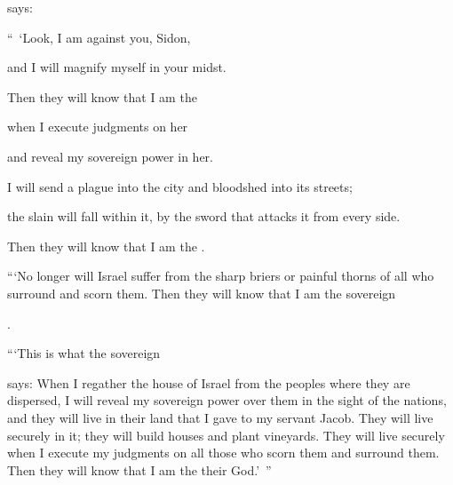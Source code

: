 {{}
says:
\par }{\Q “ ‘Look,
I am against
you, Sidon,
\par }{\Q and I will magnify
myself in your midst.
\par }{\Q Then they will know
that
I am
the {}
\par }{\Q when I execute
judgments
on her
\par }{\Q and reveal my sovereign power in her.
\par }{\Q {}I will send
a plague
into the city and bloodshed
into its streets;
\par }{\Q the slain
will fall
within
it, by the sword
that attacks it from every side.
\par }{\Q Then they will know
that
I am
the {}.
\par }{\PP {}“‘No
longer
will Israel
suffer
from the sharp briers
or painful
thorns
of all
who surround
and scorn
them. Then they will know
that
I am
the sovereign

{}.
\par }{\PP {}“‘This is what
the sovereign

{}
says: When I regather
the
house
of Israel
from
the peoples
where
they are dispersed,
I will reveal
my sovereign power over them in the sight
of the nations,
and they will live
in their land
that
I gave
to my servant
Jacob.
They will live
securely
in it; they will build
houses
and plant
vineyards.
They will live
securely
when I execute
my judgments
on all
those who scorn
them and surround
them. Then they will know
that
I am
the {}
their God.’ ”

\par }
